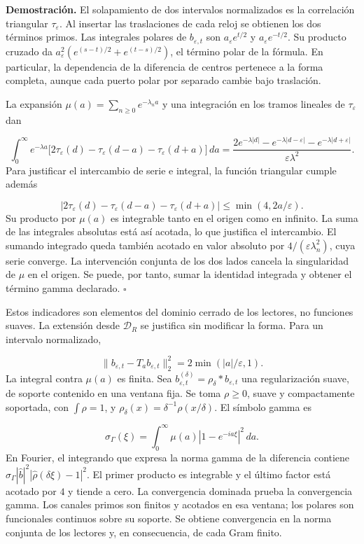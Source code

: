 \textbf{Demostración.} El solapamiento de dos intervalos normalizados es la correlación triangular \(\tau_\varepsilon\). Al insertar las traslaciones de cada reloj se obtienen los dos términos primos. Las integrales polares de \(b_{\varepsilon,t}\) son \(a_\varepsilon e^{t/2}\) y \(a_\varepsilon e^{-t/2}\). Su producto cruzado da \(a_\varepsilon^2(e^{(s-t)/2}+e^{(t-s)/2})\), el término polar de la fórmula. En particular, la dependencia de la diferencia de centros pertenece a la forma completa, aunque cada puerto polar por separado cambie bajo traslación.

La expansión \(\mu(a)=\sum_{n\geq0}e^{-\lambda_na}\) y una integración en los tramos lineales de \(\tau_\varepsilon\) dan

\[
\int_0^\infty e^{-\lambda a}
\bigl[2\tau_\varepsilon(d)-\tau_\varepsilon(d-a)
-\tau_\varepsilon(d+a)\bigr]\,da
=\frac{2e^{-\lambda|d|}-e^{-\lambda|d-\varepsilon|}
-e^{-\lambda|d+\varepsilon|}}{\varepsilon\lambda^2}.
\]
Para justificar el intercambio de serie e integral, la función triangular cumple además

\[
|2\tau_\varepsilon(d)-\tau_\varepsilon(d-a)-\tau_\varepsilon(d+a)|
\leq\min(4,2a/\varepsilon).
\]
Su producto por \(\mu(a)\) es integrable tanto en el origen como en infinito. La suma de las integrales absolutas está así acotada, lo que justifica el intercambio. El sumando integrado queda también acotado en valor absoluto por \(4/(\varepsilon\lambda_n^2)\), cuya serie converge. La intervención conjunta de los dos lados cancela la singularidad de \(\mu\) en el origen. Se puede, por tanto, sumar la identidad integrada y obtener el término gamma declarado. \hfill\(\square\)

Estos indicadores son elementos del dominio cerrado de los lectores, no funciones suaves. La extensión desde \(\mathcal D_R\) se justifica sin modificar la forma. Para un intervalo normalizado,

\[
\|b_{\varepsilon,t}-T_ab_{\varepsilon,t}\|_2^2
=2\min(|a|/\varepsilon,1).
\]
La integral contra \(\mu(a)\) es finita. Sea \(b_{\varepsilon,t}^{(\delta)}=\rho_\delta*b_{\varepsilon,t}\) una regularización suave, de soporte contenido en una ventana fija. Se toma \(\rho\geq0\), suave y compactamente soportada, con \(\int\rho=1\), y \(\rho_\delta(x)=\delta^{-1}\rho(x/\delta)\). El símbolo gamma es

\[
\sigma_\Gamma(\xi)=\int_0^\infty
\mu(a)|1-e^{-ia\xi}|^2\,da.
\]
En Fourier, el integrando que expresa la norma gamma de la diferencia contiene \(\sigma_\Gamma|\widehat b|^2 |\widehat\rho(\delta\xi)-1|^2\). El primer producto es integrable y el último factor está acotado por \(4\) y tiende a cero. La convergencia dominada prueba la convergencia gamma. Los canales primos son finitos y acotados en esa ventana; los polares son funcionales continuos sobre su soporte. Se obtiene convergencia en la norma conjunta de los lectores y, en consecuencia, de cada Gram finito.

